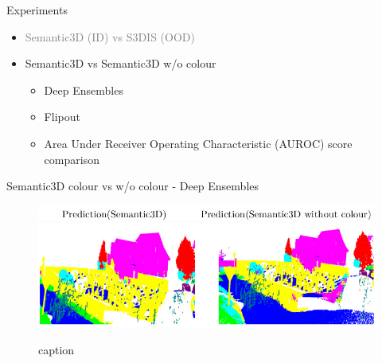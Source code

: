 \documentclass[aspectratio=169]{beamer}
\begin{document}
\begin{frame}[noframenumbering]{Experiments}
    \begin{itemize}
        \item \textcolor{gray}{Semantic3D (ID) vs S3DIS (OOD)}
        
        \item Semantic3D vs Semantic3D w/o colour
        \begin{itemize}
            \item Deep Ensembles
            \item Flipout
            \item Area Under Receiver Operating Characteristic (AUROC) score comparison
        \end{itemize}
    \end{itemize}
\end{frame}
\begin{frame}{Semantic3D colour vs w/o colour - Deep Ensembles}
    \begin{figure}
        \centering
        \includegraphics[scale=0.5]{images/ood2/top_legend_ood2.jpg}
        \includegraphics[scale=0.5]{images/ood2/Sem3d_OOD2_DE.jpg}
        \caption{caption}
        \label{fig:DE_ood2_op}
    \end{figure}
\end{frame}
\end{document}
